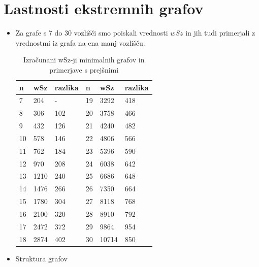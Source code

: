 \documentclass[12pt, a4paper]{article}
\begin{document}
\section[Lastnosti ekstremnih grafov]{Lastnosti ekstremnih grafov}
\begin{itemize}

\item Za grafe s 7 do 30 vozlišči smo poiskali vrednosti $wSz$ in jih tudi primerjali z vrednostmi iz grafa na ena manj vozlišču.

\begin{table}[!h]
\centering
\caption{Izračunani wSz-ji minimalnih grafov in primerjave s prejšnimi}
\begin{tabularx}{\linewidth}{|*{6}{X|}}
\hline
n & wSz & razlika &  n & wSz & razlika      \\ \hline
  7 & 204& -     & 19 & 3292& 418         \\ \hline
  8 & 306& 102& 20 & 3758&  466      \\ \hline
  9 & 432& 126& 21 & 4240&  482      \\ \hline
10 & 578& 146& 22 & 4806&  566      \\ \hline
11 & 762& 184& 23 & 5396&  590      \\ \hline
12 & 970& 208& 24 & 6038&  642       \\ \hline
13 & 1210& 240& 25 & 6686& 648         \\ \hline
14 & 1476& 266& 26 & 7350& 664        \\ \hline
15 & 1780& 304& 27 & 8118& 768       \\ \hline
16 & 2100& 320& 28 & 8910& 792        \\ \hline
17 & 2472& 372& 29 & 9864& 954         \\ \hline
18 & 2874& 402& 30 & 10714& 850         \\ \hline
\end{tabularx}
\end{table}

\large  \item Struktura grafov



\end{itemize}
\end{document}
